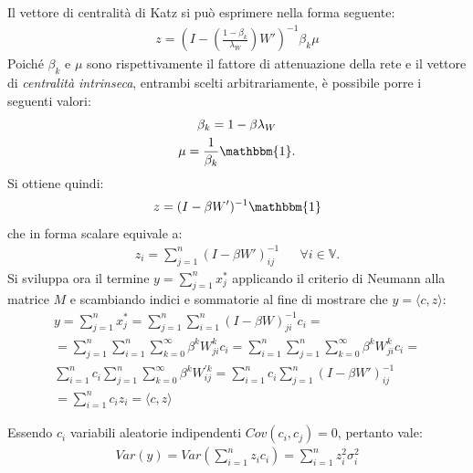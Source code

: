 \documentclass[11pt,largemargins]{homework}
\begin{document}
\begin{alphaparts}
  \questionpart %
  Il vettore di centralità di Katz si può esprimere nella forma seguente: 
  \begin{gather*}
    z = \left(I - \left(\frac{1-\beta_k}{\lambda_W}\right)W'\right)^{-1}\beta_k \mu
  \end{gather*}
  Poiché \(\beta_k\) e \(\mu\) sono rispettivamente il fattore di attenuazione della rete e il vettore di \textit{centralità intrinseca}, entrambi scelti arbitrariamente, è possibile porre i seguenti valori:
  \begin{gather*}
    \beta_k = 1-\beta \lambda_W \\
    \mu = \frac{1}{\beta_k}\mathbbm{1}.
  \end{gather*}
  Si ottiene quindi:
  \begin{gather*}
    z = (I- \beta W')^{-1} \mathbbm{1}
  \end{gather*}
  che in forma scalare equivale a:
  \begin{align}
    z_i =  \sum \limits_{j=1}^{n} (I- \beta W')_{ij}^{-1} && \forall i\in \mathbb{V}.
  \end{align}
  Si sviluppa ora il termine \(y =  \sum \limits_{j=1}^{n} x_j^*\) applicando il criterio di Neumann alla matrice \(M\) e scambiando indici e sommatorie al fine di mostrare che \(y =\langle c, z\rangle \):
  \begin{gather*}
    y =  \sum \limits_{j=1}^{n} x_j^* =  \sum \limits_{j=1}^{n}  \sum \limits_{i=1}^{n} (I-\beta W)^{-1}_{ji} c_i = \\
    =  \sum \limits_{j=1}^{n}  \sum \limits_{i=1}^{n}  \sum \limits_{k=0}^{\infty} \beta^k W_{ji}^k c_i =  \sum \limits_{i=1}^{n}  \sum \limits_{j=1}^{n}  \sum \limits_{k=0}^{\infty} \beta^k W_{ji}^k c_i = \\
     \sum \limits_{i=1}^{n} c_i  \sum \limits_{j=1}^{n}  \sum \limits_{k=0}^{\infty} \beta ^ k W_{ij}^{'k} =  \sum \limits_{i=1}^{n} c_i   \sum \limits_{j=1}^{n} (I-\beta W ')^{-1}_{ij} \\
     =  \sum \limits_{i=1}^{n}c_i z_i = \langle c, z \rangle 
  \end{gather*}

  \questionpart %
  Essendo \(c_i\) variabili aleatorie indipendenti \(Cov(c_i, c_j)=0\), pertanto vale:
  \begin{gather*}
    Var(y)=Var\left( \sum \limits_{i=1}^{n} z_i c_i\right) =  \sum \limits_{i=1}^{n} z_i^2 \sigma_i^2
  \end{gather*}


\end{alphaparts}
\end{document}
